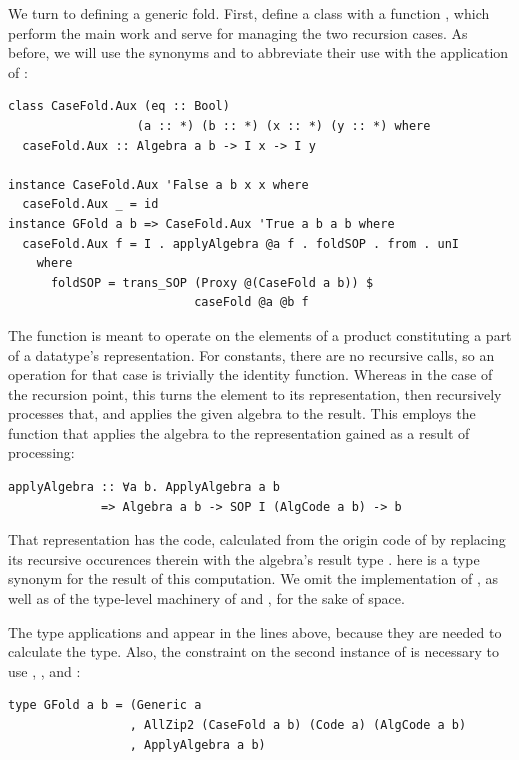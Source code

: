 \documentclass[sigplan,screen,review,anonymous]{acmart}
\begin{document}
We turn to defining a generic fold. First, define a class  with a function , which perform the main work and serve for managing the two recursion cases. As before, we will use the synonyms  and  to abbreviate their use with the application of :
\begin{lstlisting}[style=fancy]
class CaseFold.Aux (eq :: Bool)
                  (a :: *) (b :: *) (x :: *) (y :: *) where
  caseFold.Aux :: Algebra a b -> I x -> I y

instance CaseFold.Aux 'False a b x x where
  caseFold.Aux _ = id
instance GFold a b => CaseFold.Aux 'True a b a b where
  caseFold.Aux f = I . applyAlgebra @a f . foldSOP . from . unI
    where
      foldSOP = trans_SOP (Proxy @(CaseFold a b)) $
                          caseFold @a @b f
\end{lstlisting}
The function  is meant to operate on the elements of a product constituting a part of a datatype's representation. For constants, there are no recursive calls, so an operation for that case is trivially the identity function. Whereas in the case of the recursion point, this turns the element to its representation, then recursively processes that, and applies the given algebra to the result. This employs the function  that applies the algebra to the representation gained as a result of processing:
\begin{lstlisting}[style=fancy]
applyAlgebra :: ∀a b. ApplyAlgebra a b
             => Algebra a b -> SOP I (AlgCode a b) -> b
\end{lstlisting}
That representation has the code, calculated from the origin code of  by replacing its recursive occurences therein with the algebra's result type .  here is a type synonym for the result of this computation. We omit the implementation of , as well as of the type-level machinery of  and , for the sake of space.

The type applications  and  appear in the lines above, because they are needed to calculate the  type. Also, the constraint  on the second instance of  is necessary to use , , and :
\begin{lstlisting}[style=fancy]
type GFold a b = (Generic a
                 , AllZip2 (CaseFold a b) (Code a) (AlgCode a b)
                 , ApplyAlgebra a b)
\end{lstlisting}
\end{document}
